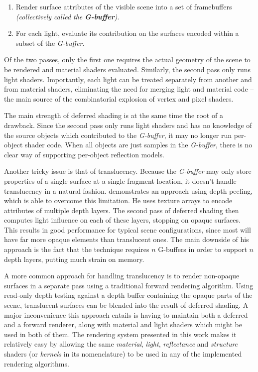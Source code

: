 \begin{enumerate}
\item Render surface attributes of the visible scene into a set of framebuffers \emph{(collectively called the \textbf{G-buffer})}.
\item For each light, evaluate its contribution on the surfaces encoded within a subset of the \emph{G-buffer}.
\end{enumerate}

Of the two passes, only the first one requires the actual geometry of the scene to be rendered and material shaders evaluated. Similarly, the second pass only runs light shaders. Importantly, each light can be treated separately from another and from material shaders, eliminating the need for merging light and material code -- the main source of the combinatorial explosion of vertex and pixel shaders.

The main strength of deferred shading is at the same time the root of a drawback. Since the second pass only runs light shaders and has no knowledge of the source objects which contributed to the \emph{G-buffer}, it may no longer run per-object shader code. When all objects are just samples in the \emph{G-buffer}, there is no clear way of supporting per-object reflection models.

Another tricky issue is that of translucency. Because the \emph{G-buffer} may only store properties of a single surface at a single fragment location, it doesn't handle translucency in a natural fashion. \citet{HumusDeepDeferred} demonstrates an approach using depth peeling, which is able to overcome this limitation. He uses texture arrays to encode attributes of multiple depth layers. The second pass of deferred shading then computes light influence on each of these layers, stopping on opaque surfaces. This results in good performance for typical scene configurations, since most will have far more opaque elements than translucent ones. The main downside of his approach is the fact that the technique requires $n$ G-buffers in order to support $n$ depth layers, putting much strain on memory.

A more common approach for handling translucency is to render non-opaque surfaces in a separate pass using a traditional forward rendering algorithm. Using read-only depth testing against a depth buffer containing the opaque parts of the scene, translucent surfaces can be blended into the result of deferred shading. A major inconvenience this approach entails is having to maintain both a deferred and a forward renderer, along with material and light shaders which might be used in both of them. The rendering system presented in this work makes it relatively easy by allowing the same \emph{material}, \emph{light}, \emph{reflectance} and \emph{structure} shaders (or \emph{kernels} in its nomenclature) to be used in any of the implemented rendering algorithms.

